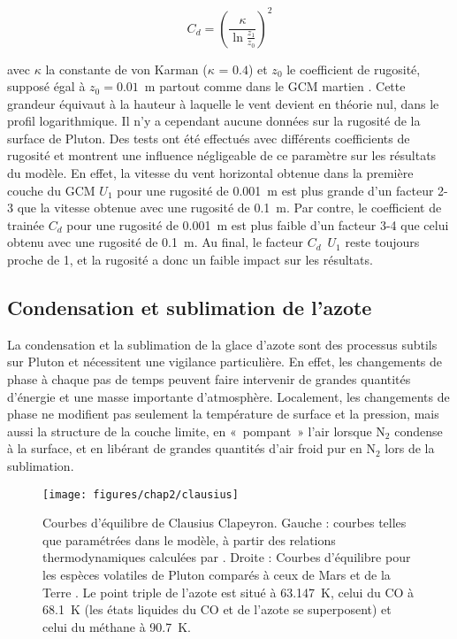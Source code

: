 \begin{equation}
C_d = \left( \frac{\kappa}{\ln{\frac{z_1}{z_0}}} \right)^2
\label{eq:cd}
\end{equation}

avec $\kappa$ la constante de von Karman ($\kappa$ = $0.4$) et $z_{0}$ le coefficient de rugosité, supposé égal à $z_{0}=0.01$~m partout comme dans le GCM martien \citep{Forg:99}. Cette grandeur équivaut à la hauteur à laquelle le vent devient en théorie nul, dans le profil logarithmique. 
Il n'y a cependant aucune données sur la rugosité de la surface de Pluton. Des tests ont été effectués avec différents coefficients de rugosité et montrent une influence négligeable de ce paramètre sur les résultats du modèle. En effet, la vitesse du vent horizontal obtenue dans la première couche du GCM $U_1$ pour une rugosité de 0.001~m est plus grande d’un facteur 2-3 que la vitesse obtenue avec une rugosité de 0.1~m. Par contre, le coefficient de trainée $C_d$ pour une rugosité de 0.001~m est plus faible d’un facteur 3-4 que celui obtenu avec une rugosité de 0.1~m. Au final, le facteur $C_d$~$U_1$ reste toujours proche de 1, et la rugosité a donc un faible impact sur les résultats.

\subsection{Condensation et sublimation de l’azote}
\label{sc:cond}

La condensation et la sublimation de la glace d’azote sont des processus subtils sur Pluton et nécessitent une vigilance particulière.  En effet, les changements de phase à chaque pas de temps peuvent faire intervenir de grandes quantités d’énergie et une masse importante d’atmosphère. 
Localement, les changements de phase ne modifient pas seulement la température de surface et la pression, mais aussi la structure de la couche limite, en «~pompant~» l’air lorsque N$_2$ condense à la surface, et en libérant de grandes quantités d’air froid pur en N$_2$ lors de la sublimation. 

\begin{figure}[!h]
\begin{center} 
	\texttt{[image: figures/chap2/clausius]}
\end{center} 
\caption{Courbes d’équilibre de Clausius Clapeyron. Gauche : courbes telles que paramétrées dans le modèle, à partir des relations thermodynamiques calculées par \citet{FraySchm:09}. Droite : Courbes d’équilibre pour les espèces volatiles de Pluton comparés à ceux de Mars et de la Terre  \citep{Moor:17}. Le point triple de l’azote est situé à 63.147~K, celui du CO à 68.1~K (les états liquides du CO et de l’azote se superposent) et celui du méthane à 90.7~K.} 
\label{clausius}
\end{figure}

